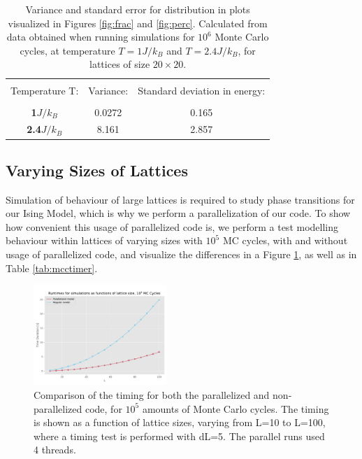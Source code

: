 \documentclass[10pt, nofootinbib, twocolumn]{revtex4-1}
\begin{document}
\begin{center}
    \begin{table}[H]
    \caption{Variance and standard error for distribution in plots visualized in Figures \ref{fig:frac} and \ref{fig:perc}. Calculated from data obtained when running simulations for $10^6$ Monte Carlo cycles, at temperature $T=1J/k_B$ and $T=2.4J/k_B$, for lattices of size $20\times 20$.}
        \begin{tabular*}{0.5\textwidth}{@{\extracolsep{\fill}}ccc}
        \toprule
        \hline \\
        Temperature T: & Variance: &  Standard deviation in energy: \\
        \midrule
        \hline \\
        \textbf{1$J/k_B$} & 0.0272 &  0.165 \\
        \textbf{2.4$J/k_B$} & 8.161 &  2.857 \\
        \hline
        \bottomrule
        \end{tabular*}\label{tab:var}
    \end{table}
\end{center}


\newpage
\subsection{Varying Sizes of Lattices}
Simulation of behaviour of large lattices is required to study phase transitions for our Ising Model, which is why we perform a parallelization of our code. To show how convenient this usage of parallelized code is, we perform a test modelling behaviour within lattices of varying sizes with $10^5$ MC cycles, with and without usage of parallelized code, and visualize the differences in a Figure \ref{fig:parallel}, as well as in Table \ref{tab:mcctimer}. 

\begin{figure}[H]
    \centering
    \includegraphics[width = 0.45\textwidth]{figures/duration.pdf} 
    \caption{Comparison of the timing for both the parallelized and non-parallelized code, for $10^5$ amounts of Monte Carlo cycles. The timing is shown as a function of lattice sizes, varying from L=10 to L=100, where a timing test is performed with dL=5. The parallel runs used 4 threads.}
    \label{fig:parallel}
\end{figure} 
\end{document}
